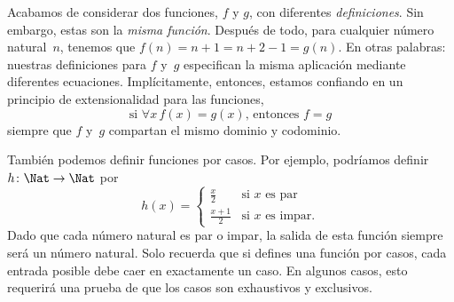 \documentclass[../../../include/open-logic-section]{subfiles}
\begin{document}
\begin{explain}
Acabamos de considerar dos funciones, $f$ y $g$, con diferentes \emph{definiciones}. Sin embargo, estas son la \emph{misma función}. Después de todo, para cualquier número natural~$n$, tenemos que $f(n) = n+1 = n+2-1 = g(n)$. En otras palabras: nuestras definiciones para $f$ y~$g$ especifican la misma aplicación mediante diferentes ecuaciones. Implícitamente, entonces, estamos confiando en un principio de extensionalidad para las funciones,
\[
  \text{si }\forall x\, f(x) = g(x)\text{, entonces }f = g
\]
siempre que $f$ y~$g$ compartan el mismo dominio y codominio.
\end{explain}

\begin{ex}
También podemos definir funciones por casos. Por ejemplo, podríamos definir $h \colon \Nat \to \Nat$ por
\[
h(x) =
\begin{cases}
  \frac{x}{2} & \text{si $x$ es par} \\
  \frac{x+1}{2} & \text{si $x$ es impar.}
\end{cases}
\]
Dado que cada número natural es par o impar, la salida de esta función siempre será un número natural. Solo recuerda que si defines una función por casos, cada entrada posible debe caer en exactamente un caso. En algunos casos, esto requerirá una prueba de que los casos son exhaustivos y exclusivos.
\end{ex}
\end{document}
